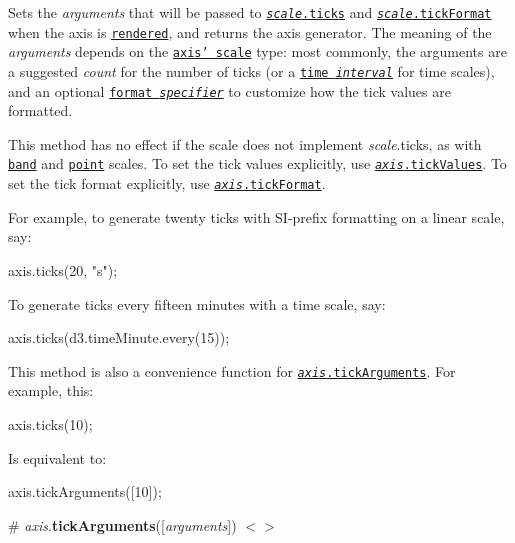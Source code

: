 Sets the {\itshape arguments} that will be passed to \href{https://github.com/d3/d3-scale/blob/master/README.md#continuous_ticks}{\tt {\itshape scale}.ticks} and \href{https://github.com/d3/d3-scale/blob/master/README.md#continuous_tickFormat}{\tt {\itshape scale}.tick\+Format} when the axis is \href{#_axis}{\tt rendered}, and returns the axis generator. The meaning of the {\itshape arguments} depends on the \href{#axis_scale}{\tt axis’ scale} type\+: most commonly, the arguments are a suggested {\itshape count} for the number of ticks (or a \href{https://github.com/d3/d3-time}{\tt time {\itshape interval}} for time scales), and an optional \href{https://github.com/d3/d3-format}{\tt format {\itshape specifier}} to customize how the tick values are formatted.

This method has no effect if the scale does not implement {\itshape scale}.ticks, as with \href{https://github.com/d3/d3-scale/blob/master/README.md#band-scales}{\tt band} and \href{https://github.com/d3/d3-scale/blob/master/README.md#point-scales}{\tt point} scales. To set the tick values explicitly, use \href{#axis_tickValues}{\tt {\itshape axis}.tick\+Values}. To set the tick format explicitly, use \href{#axis_tickFormat}{\tt {\itshape axis}.tick\+Format}.

For example, to generate twenty ticks with S\+I-\/prefix formatting on a linear scale, say\+:


\begin{DoxyCode}
axis.ticks(20, "s");
\end{DoxyCode}


To generate ticks every fifteen minutes with a time scale, say\+:


\begin{DoxyCode}
axis.ticks(d3.timeMinute.every(15));
\end{DoxyCode}


This method is also a convenience function for \href{#axis_tickArguments}{\tt {\itshape axis}.tick\+Arguments}. For example, this\+:


\begin{DoxyCode}
axis.ticks(10);
\end{DoxyCode}


Is equivalent to\+:


\begin{DoxyCode}
axis.tickArguments([10]);
\end{DoxyCode}


\label{_axis_tickArguments}%
\# {\itshape axis}.{\bfseries tick\+Arguments}(\mbox{[}{\itshape arguments}\mbox{]}) \href{https://github.com/d3/d3-axis/blob/master/src/axis.js#L128}{\tt $<$$>$}

